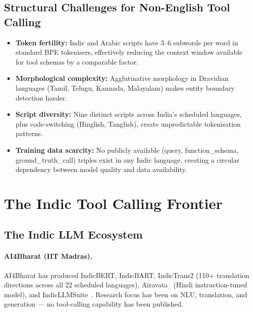 \documentclass[11pt]{article}
\begin{document}
\subsection{Structural Challenges for Non-English Tool Calling}

\begin{itemize}[leftmargin=1.2em, itemsep=2pt]
  \item \textbf{Token fertility:} Indic and Arabic scripts have 3--6 subwords per word in standard
        BPE tokenisers, effectively reducing the context window available for tool schemas by a
        comparable factor.
  \item \textbf{Morphological complexity:} Agglutinative morphology in Dravidian languages (Tamil,
        Telugu, Kannada, Malayalam) makes entity boundary detection harder.
  \item \textbf{Script diversity:} Nine distinct scripts across India's scheduled languages, plus
        code-switching (Hinglish, Tanglish), create unpredictable tokenisation patterns.
  \item \textbf{Training data scarcity:} No publicly available (query, function\_schema,
        ground\_truth\_call) triples exist in any Indic language, creating a circular dependency
        between model quality and data availability.
\end{itemize}

\section{The Indic Tool Calling Frontier}
\label{sec:indic}

\subsection{The Indic LLM Ecosystem}

\paragraph{AI4Bharat (IIT Madras).}
AI4Bharat has produced IndicBERT, IndicBART, IndicTrans2 (110+ translation directions across all
22 scheduled languages), Airavata~\citep{gala2024airavata} (Hindi instruction-tuned model),
and IndicLLMSuite~\citep{indicllmsuite2024}. Research focus has been on NLU, translation, and
generation --- no tool-calling capability has been published.
\end{document}
